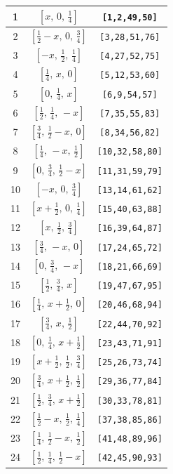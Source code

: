 \documentclass[fleqn,8pt]{jsarticle}
\begin{document}
\begin{longtable}{ccc}
1 & $\left[ x,\, 0,\, \frac{1}{4} \right]$ & {\tt [1,2,49,50]} \\ \hline
2 & $\left[ \frac{1}{2} - x,\, 0,\, \frac{3}{4} \right]$ & {\tt [3,28,51,76]} \\ \hline
3 & $\left[ - x,\, \frac{1}{2},\, \frac{1}{4} \right]$ & {\tt [4,27,52,75]} \\ \hline
4 & $\left[ \frac{1}{4},\, x,\, 0 \right]$ & {\tt [5,12,53,60]} \\ \hline
5 & $\left[ 0,\, \frac{1}{4},\, x \right]$ & {\tt [6,9,54,57]} \\ \hline
6 & $\left[ \frac{1}{2},\, \frac{1}{4},\, - x \right]$ & {\tt [7,35,55,83]} \\ \hline
7 & $\left[ \frac{3}{4},\, \frac{1}{2} - x,\, 0 \right]$ & {\tt [8,34,56,82]} \\ \hline
8 & $\left[ \frac{1}{4},\, - x,\, \frac{1}{2} \right]$ & {\tt [10,32,58,80]} \\ \hline
9 & $\left[ 0,\, \frac{3}{4},\, \frac{1}{2} - x \right]$ & {\tt [11,31,59,79]} \\ \hline
10 & $\left[ - x,\, 0,\, \frac{3}{4} \right]$ & {\tt [13,14,61,62]} \\ \hline
11 & $\left[ x + \frac{1}{2},\, 0,\, \frac{1}{4} \right]$ & {\tt [15,40,63,88]} \\ \hline
12 & $\left[ x,\, \frac{1}{2},\, \frac{3}{4} \right]$ & {\tt [16,39,64,87]} \\ \hline
13 & $\left[ \frac{3}{4},\, - x,\, 0 \right]$ & {\tt [17,24,65,72]} \\ \hline
14 & $\left[ 0,\, \frac{3}{4},\, - x \right]$ & {\tt [18,21,66,69]} \\ \hline
15 & $\left[ \frac{1}{2},\, \frac{3}{4},\, x \right]$ & {\tt [19,47,67,95]} \\ \hline
16 & $\left[ \frac{1}{4},\, x + \frac{1}{2},\, 0 \right]$ & {\tt [20,46,68,94]} \\ \hline
17 & $\left[ \frac{3}{4},\, x,\, \frac{1}{2} \right]$ & {\tt [22,44,70,92]} \\ \hline
18 & $\left[ 0,\, \frac{1}{4},\, x + \frac{1}{2} \right]$ & {\tt [23,43,71,91]} \\ \hline
19 & $\left[ x + \frac{1}{2},\, \frac{1}{2},\, \frac{3}{4} \right]$ & {\tt [25,26,73,74]} \\ \hline
20 & $\left[ \frac{3}{4},\, x + \frac{1}{2},\, \frac{1}{2} \right]$ & {\tt [29,36,77,84]} \\ \hline
21 & $\left[ \frac{1}{2},\, \frac{3}{4},\, x + \frac{1}{2} \right]$ & {\tt [30,33,78,81]} \\ \hline
22 & $\left[ \frac{1}{2} - x,\, \frac{1}{2},\, \frac{1}{4} \right]$ & {\tt [37,38,85,86]} \\ \hline
23 & $\left[ \frac{1}{4},\, \frac{1}{2} - x,\, \frac{1}{2} \right]$ & {\tt [41,48,89,96]} \\ \hline
24 & $\left[ \frac{1}{2},\, \frac{1}{4},\, \frac{1}{2} - x \right]$ & {\tt [42,45,90,93]} \\
\end{longtable}
\end{document}
